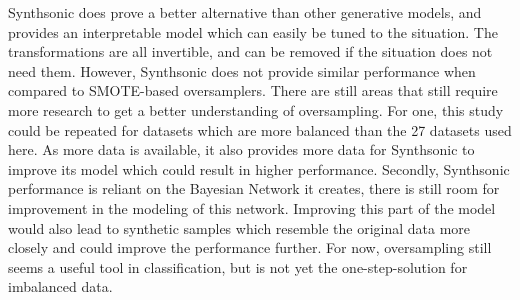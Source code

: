 Synthsonic does prove a better alternative than other generative models, and provides an interpretable model which can easily be tuned to the situation. The transformations are all invertible, and can be removed if the situation does not need them. However, Synthsonic does not provide similar performance when compared to SMOTE-based oversamplers. There are still areas that still require more research to get a better understanding of oversampling. For one, this study could be repeated for datasets which are more balanced than the 27 datasets used here. As more data is available, it also provides more data for Synthsonic to improve its model which could result in higher performance. Secondly, Synthsonic performance is reliant on the Bayesian Network it creates, there is still room for improvement in the modeling of this network. Improving this part of the model would also lead to synthetic samples which resemble the original data more closely and could improve the performance further. For now, oversampling still seems a useful tool in classification, but is not yet the one-step-solution for imbalanced data.